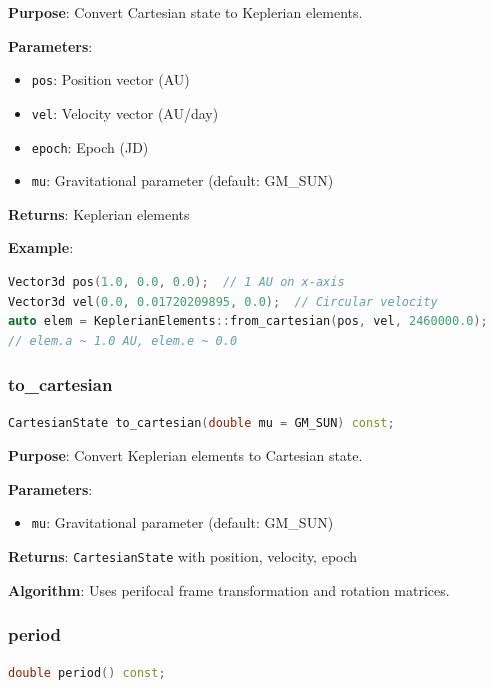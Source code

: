\textbf{Purpose}: Convert Cartesian state to Keplerian elements.

\textbf{Parameters}:
\begin{itemize}
    \item \texttt{pos}: Position vector (AU)
    \item \texttt{vel}: Velocity vector (AU/day)
    \item \texttt{epoch}: Epoch (JD)
    \item \texttt{mu}: Gravitational parameter (default: GM\_SUN)
\end{itemize}

\textbf{Returns}: Keplerian elements

\textbf{Example}:
\begin{lstlisting}[language=C++]
Vector3d pos(1.0, 0.0, 0.0);  // 1 AU on x-axis
Vector3d vel(0.0, 0.01720209895, 0.0);  // Circular velocity
auto elem = KeplerianElements::from_cartesian(pos, vel, 2460000.0);
// elem.a ~ 1.0 AU, elem.e ~ 0.0
\end{lstlisting}

\subsubsection{to\_cartesian}

\begin{lstlisting}[language=C++]
CartesianState to_cartesian(double mu = GM_SUN) const;
\end{lstlisting}

\textbf{Purpose}: Convert Keplerian elements to Cartesian state.

\textbf{Parameters}:
\begin{itemize}
    \item \texttt{mu}: Gravitational parameter (default: GM\_SUN)
\end{itemize}

\textbf{Returns}: \texttt{CartesianState} with position, velocity, epoch

\textbf{Algorithm}: Uses perifocal frame transformation and rotation matrices.

\subsubsection{period}

\begin{lstlisting}[language=C++]
double period() const;
\end{lstlisting}

